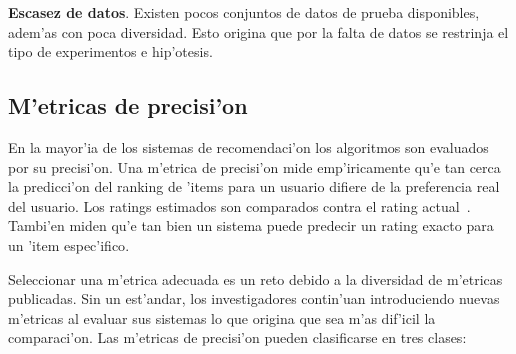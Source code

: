 \documentclass[11pt]{article}
\begin{document}
\bigskip
\noindent
\textbf{Escasez de datos}. Existen pocos conjuntos de datos de prueba disponibles, adem'as con poca diversidad. Esto origina que por la falta de datos se restrinja el tipo de experimentos e hip'otesis.
\subsection{M'etricas de precisi'on}

En la mayor'ia de los sistemas de recomendaci'on los algoritmos son evaluados por su precisi'on. Una m'etrica de precisi'on mide emp'iricamente qu'e tan cerca la predicci'on del ranking de 'items para un usuario difiere de la preferencia real del usuario. Los ratings estimados son comparados contra el rating actual~\cite{start:candillier09}. Tambi'en miden qu'e tan bien un sistema puede predecir un rating exacto para un 'item espec'ifico\cite{Herlocker04evaluatingcollaborative}.

Seleccionar una m'etrica adecuada es un reto debido a la diversidad de m'etricas publicadas. Sin un est'andar, los investigadores contin'uan introduciendo nuevas m'etricas al evaluar sus sistemas lo que origina que sea m'as dif'icil la comparaci'on. Las m'etricas de precisi'on pueden clasificarse en tres clases: 
\end{document}
